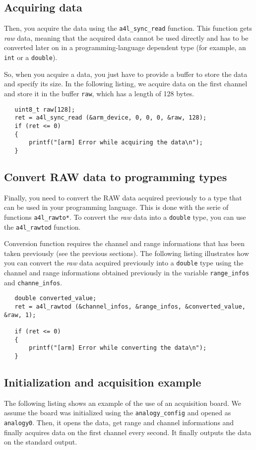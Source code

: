 \documentclass[11pt]{book}
\begin{document}
   \subsection{Acquiring data}
   Then, you acquire the data using the \texttt{a4l\_sync\_read} function. This
   function gets \textit{raw} data, meaning that the acquired data cannot be
   used directly and has to be converted later on in a programming-language
   dependent type (for example, an \texttt{int} or a \texttt{double}).

   So, when you acquire a data, you just have to provide a buffer to store the
   data and specify its size. In the following listing, we acquire data on the
   first channel and store it in the buffer \texttt{raw}, which has a length of
   128 bytes.

   \begin{lstlisting}
   uint8_t raw[128];
   ret = a4l_sync_read (&arm_device, 0, 0, 0, &raw, 128);
   if (ret <= 0)
   {
       printf("[arm] Error while acquiring the data\n");
   }
   \end{lstlisting}

   \subsection{Convert RAW data to programming types}
   Finally, you need to convert the RAW data acquired previously to a type that
   can be used in your programming language. This is done with the serie of
   functions \texttt{a4l\_rawto*}. To convert the \textit{raw} data into a
   \texttt{double} type, you can use the \texttt{a4l\_rawtod} function.

   Conversion function requires the channel and range informations that has been
   taken previously (see the previous sections). The following listing
   illustrates how you can convert the \textit{raw} data acquired previously
   into a \texttt{double} type using the channel and range informations obtained
   previously in the variable \texttt{range\_infos} and \texttt{channe\_infos}.
   \begin{lstlisting}
   double converted_value;
   ret = a4l_rawtod (&channel_infos, &range_infos, &converted_value, &raw, 1);

   if (ret <= 0)
   {
       printf("[arm] Error while converting the data\n");
   }
   \end{lstlisting}


   \subsection{Initialization and acquisition example}
   The following listing shows an example of the use of an acquisition board. We
   assume the board was initialized using the \texttt{analogy\_config} and
   opened as \texttt{analogy0}. Then, it opens the data, get range and channel
   informations and finally acquires data on the first channel every second. It
   finally outputs the data on the standard output.
\end{document}
